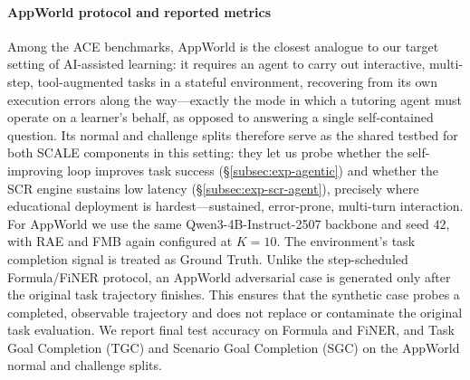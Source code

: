 \documentclass[10pt,conference]{IEEEtran}
\begin{document}
\paragraph{AppWorld protocol and reported metrics}
Among the ACE benchmarks, AppWorld is the closest analogue to our target
setting of AI-assisted learning: it requires an agent to carry out
interactive, multi-step, tool-augmented tasks in a stateful environment,
recovering from its own execution errors along the way---exactly the
mode in which a tutoring agent must operate on a learner's behalf, as
opposed to answering a single self-contained question. Its normal and
challenge splits therefore serve as the shared testbed for both SCALE
components in this setting: they let us probe whether the self-improving
loop improves task success (§\ref{subsec:exp-agentic}) and whether the
SCR engine sustains low latency (§\ref{subsec:exp-scr-agent}), precisely
where educational deployment is hardest---sustained, error-prone,
multi-turn interaction.
For AppWorld we use the same Qwen3-4B-Instruct-2507 backbone and seed
$42$, with RAE and FMB again configured at $K=10$. The environment's
task completion signal is treated as Ground Truth. Unlike the
step-scheduled Formula/FiNER protocol, an AppWorld adversarial case is
generated only after the original task trajectory finishes. This ensures
that the synthetic case probes a completed, observable trajectory and
does not replace or contaminate the original task evaluation. We report
final test accuracy on Formula and FiNER, and Task Goal Completion (TGC)
and Scenario Goal Completion (SGC) on the AppWorld normal and challenge
splits.
\end{document}
